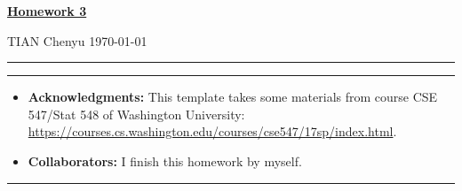 \documentclass[a4paper]{article}
\begin{document}
\courseheader



\setcounter{hwcnt}{2} %

\begin{center}
  \underline{\bf Homework 3}%
\end{center}
\begin{flushleft}
  TIAN Chenyu\hfill
  \today
\end{flushleft}
\hrule

\vspace{2em}

\flushleft
\rule{\textwidth}{1pt}
\begin{itemize}
\item {\bf Acknowledgments: \/} 
  This template takes some materials from course CSE 547/Stat 548 of Washington University: \small{\url{https://courses.cs.washington.edu/courses/cse547/17sp/index.html}}.
\item {\bf Collaborators: \/}
  I finish this homework by myself.
\end{itemize}
\rule{\textwidth}{1pt}

\vspace{2em}

\end{document}
